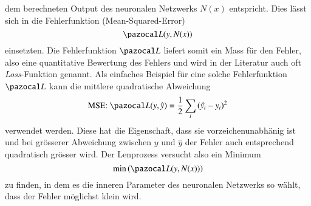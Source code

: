 dem berechneten Output des neuronalen Netzwerks $N(x)$ entspricht. Dies lässt sich in die Fehlerfunktion (Mean-Squared-Error)
\begin{equation}
\Lb(y,N(x))
\label{ableitung:eqn:loss_net}
\end{equation}
einsetzten.
Die Fehlerfunktion $\Lb$ liefert somit ein Mass für den Fehler, also eine quantitative Bewertung des Fehlers und wird in der Literatur auch oft \textit{Loss}-Funktion genannt. Als einfaches Beispiel für eine solche Fehlerfunktion $\Lb$ kann die mittlere quadratische Abweichung 
\begin{equation}
\text{MSE: } \Lb (y, \hat{y}) = \frac{1}{2} \sum_i \left( \hat{y_i} - y_i \right)^2
\label{ableitung:eqn:loss}
\end{equation}
verwendet werden. Diese hat die Eigenschaft, dass sie vorzeichenunabhänig ist und bei grösserer Abweichung zwischen $y$ und $\hat{y}$ der Fehler auch entsprechend quadratisch grösser wird.
Der Lenprozess versucht also ein Minimum 
\begin{equation}
	\min \left( \Lb(y,N(x)) \right) 
	\label{ableitung:eqn:min_loss}
\end{equation}
zu finden, in dem es die inneren Parameter des neuronalen Netzwerks so wählt, dass der Fehler möglichst klein wird.
